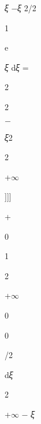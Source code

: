 \documentclass[a4paper,portrait,12pt]{article}
\begin{document}
\begin{flushleft}
𝜉 $-$𝜉 2/2
\end{flushleft}


1


\begin{flushleft}
e
\end{flushleft}


\begin{flushleft}
𝜉 d𝜉 =
\end{flushleft}


2


2


$-$





\begin{flushleft}
𝜉2
\end{flushleft}


2





+$\infty$





]]]





+


0





1


2





+$\infty$


0





0





/2





\begin{flushleft}
d𝜉
\end{flushleft}





2





\begin{flushleft}
+$\infty$ $-$ 𝜉
\end{flushleft}
\end{document}
